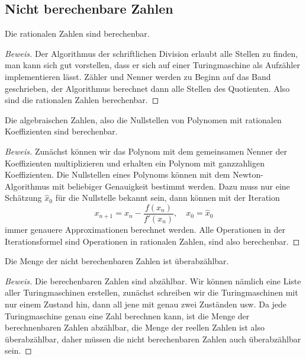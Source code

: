 \subsection{Nicht berechenbare Zahlen}

\begin{satz}
Die rationalen Zahlen sind berechenbar.
\end{satz}

\begin{proof}[Beweis]
Der Algorithmus der schriftlichen Division erlaubt alle Stellen
zu finden, man kann sich gut vorstellen, dass er sich auf einer
Turingmaschine als Aufzähler implementieren lässt. Zähler und
Nenner werden zu Beginn auf das Band geschrieben, der Algorithmus
berechnet dann alle Stellen des Quotienten. Also sind die rationalen
Zahlen berechenbar.
\end{proof}

\begin{satz}Die algebraischen Zahlen, also die Nullstellen von
Polynomen mit rationalen Koeffizienten sind berechenbar.
\end{satz}

\begin{proof}[Beweis]
Zunächst können wir das Polynom mit dem gemeinsamen Nenner der
Koeffizienten multiplizieren und erhalten ein Polynom mit ganzzahligen
Koeffizienten.
Die Nullstellen eines Polynoms können mit dem Newton-Algorithmus
mit beliebiger Genauigkeit bestimmt werden. Dazu muss nur eine
Schätzung $\hat x_0$ für die Nullstelle bekannt sein, dann können
mit der Iteration
\[
x_{n+1}=x_n-\frac{f(x_n)}{f'(x_n)},\quad x_0 = \hat x_0
\]
immer genauere Approximationen berechnet werden. Alle Operationen
in der Iterationsformel sind Operationen in rationalen Zahlen, sind
also berechenbar.
\end{proof}

\begin{satz}
Die Menge der nicht berechenbaren Zahlen ist überabzählbar.
\end{satz}

\begin{proof}[Beweis]
Die berechenbaren Zahlen sind abzählbar. Wir können nämlich
eine Liste aller Turingmaschinen erstellen, zunächst schreiben
wir die Turingmaschinen mit nur einem Zustand hin, dann all jene
mit genau zwei Zuständen usw. Da jede Turingmaschine genau eine
Zahl berechnen kann, ist die Menge der berechnenbaren Zahlen abzählbar,
die Menge der reellen Zahlen ist also überabzählbar, daher müssen die
nicht berechenbaren Zahlen auch überabzählbar sein.
\end{proof}

